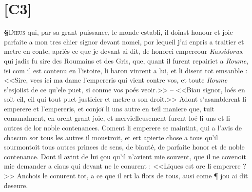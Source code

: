 \documentclass[12pt]{article} %
\newcommand{\colmar}[1]{\marginnote{[#1]}}          %
\newcommand{\persName}[1]{\emph{#1}} %
\newcommand{\placeName}[1]{\emph{#1}} %
\newcounter{paranum}
\newcommand{\pnum}{\stepcounter{paranum}\textbf{§\arabic{paranum}}\quad}
\begin{document}
\section*{[C3]}


\pnum \lettrine[lines=4]{\color{darkred}D}{ieus} qui, par sa grant puissance, le monde establi, il doinst honour et joie parfaite a mon tres chier signor devant nomei, por lequeil j'ai enpris a traitier et metre en conte, apriés ce que je devant ai dit, de honorei \colmar{3rb}\colmar{b} empereour \persName{Kassidorus}, qui jadis fu sire des Roumains et des Gris, que, quant il furent repairiet a \placeName{Roume}, isi com il est contenu en l'istoire, li baron vinrent a lui, et li disent tot emsanble : <<Sire, vees ici ma dame l'empereris qui vient contre vos, et toute \placeName{Roume} s'esjoiist de ce qu'ele puet, si conme vos poés veoir.>> -- <<Biau signor, loés en soit cil, cil qui tout puet justicier et metre a son droit.>> Adont s'asamblerent li emperere et l'empereris, et conjoï li uns autre en teil maniere que, tuit comunalment, en orent grant joie, et mervielleusement furent loé li uns et li autres de lor noble contenances. Coment li emperere se maintint, qui a l'avis de chascun sor tous les autres il moustroit, et ert apierte chose a tous qu'il sourmontoit tous autres princes de sens, de biauté, de parfaite honor et de noble contenance. Dont il avint de lui çou qu'il n'avient mie souvent, que il ne covenoit mie demander a ciaus qui devant ne le conurent : <<Liques est ore li emperere ?>> Anchois le conurent tot, a ce que il ert la flors de tous, ausi come ¶ jou ai dit deseure.
\end{document}
